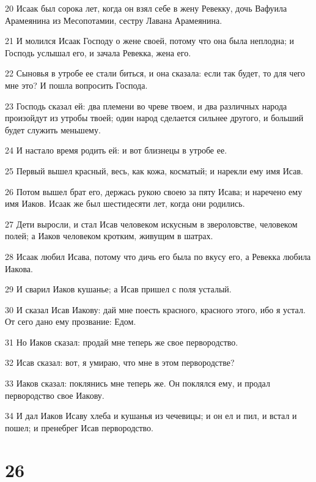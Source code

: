 \par 20 Исаак был сорока лет, когда он взял себе в жену Ревекку, дочь Вафуила Арамеянина из Месопотамии, сестру Лавана Арамеянина.
\par 21 И молился Исаак Господу о жене своей, потому что она была неплодна; и Господь услышал его, и зачала Ревекка, жена его.
\par 22 Сыновья в утробе ее стали биться, и она сказала: если так будет, то для чего мне это? И пошла вопросить Господа.
\par 23 Господь сказал ей: два племени во чреве твоем, и два различных народа произойдут из утробы твоей; один народ сделается сильнее другого, и больший будет служить меньшему.
\par 24 И настало время родить ей: и вот близнецы в утробе ее.
\par 25 Первый вышел красный, весь, как кожа, косматый; и нарекли ему имя Исав.
\par 26 Потом вышел брат его, держась рукою своею за пяту Исава; и наречено ему имя Иаков. Исаак же был шестидесяти лет, когда они родились.
\par 27 Дети выросли, и стал Исав человеком искусным в звероловстве, человеком полей; а Иаков человеком кротким, живущим в шатрах.
\par 28 Исаак любил Исава, потому что дичь его была по вкусу его, а Ревекка любила Иакова.
\par 29 И сварил Иаков кушанье; а Исав пришел с поля усталый.
\par 30 И сказал Исав Иакову: дай мне поесть красного, красного этого, ибо я устал. От сего дано ему прозвание: Едом.
\par 31 Но Иаков сказал: продай мне теперь же свое первородство.
\par 32 Исав сказал: вот, я умираю, что мне в этом первородстве?
\par 33 Иаков сказал: поклянись мне теперь же. Он поклялся ему, и продал первородство свое Иакову.
\par 34 И дал Иаков Исаву хлеба и кушанья из чечевицы; и он ел и пил, и встал и пошел; и пренебрег Исав первородство.

\chapter{26}

